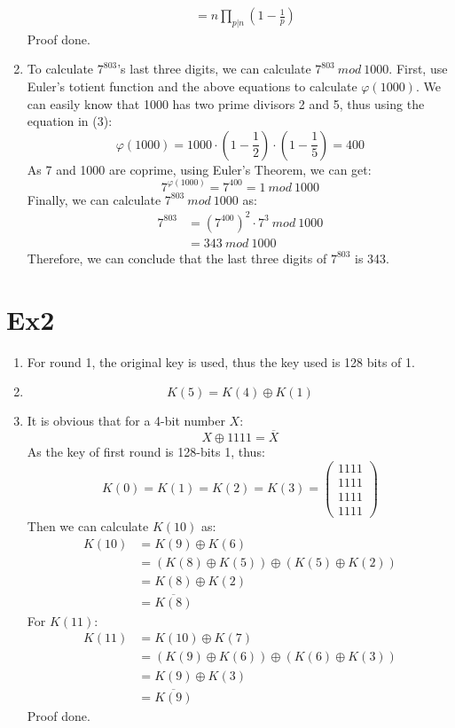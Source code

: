 \documentclass[12pt, a4paper]{article}
\begin{document}
\begin{enumerate}
\begin{align*}
                         &= n \prod_{p|n}(1 - \frac{1}{p})
          \end{align*}
          Proof done.
    \item To calculate $7^{803}$'s last three digits, we can calculate $7^{803}\ mod\ 1000$.\newline
          First, use Euler's totient function and the above equations to calculate $\varphi(1000)$. 
          We can easily know that 1000 has two prime divisors 2 and 5, thus using the equation in (3):
          $$\varphi(1000) = 1000\cdot (1 - \frac{1}{2})\cdot (1 - \frac{1}{5}) = 400$$
          As 7 and 1000 are coprime, using Euler's Theorem, we can get:
          $$7^{\varphi(1000)} = 7^{400} = 1\ mod\ 1000$$
          Finally, we can calculate $7^{803}\ mod\ 1000$ as:
          \begin{align*}
              7^{803} &= (7^{400})^2\cdot 7^3\ mod\ 1000\\
                      &= 343\ mod\ 1000
          \end{align*}
          Therefore, we can conclude that the last three digits of $7^{803}$ is 343.
          
\end{enumerate}

\section*{Ex2}
\begin{enumerate}
    \item For round 1, the original key is used, thus the key used is 128 bits of 1.
    \item $$K(5) = K(4) \oplus K(1)$$
    \item It is obvious that for a 4-bit number $X$:
          $$X \oplus 1111 = \overline{X}$$
          As the key of first round is 128-bits 1, thus:
          $$K(0) = K(1) = K(2) = K(3) = \begin{pmatrix} 1111\\ 1111\\ 1111\\ 1111\end{pmatrix}$$
          Then we can calculate $K(10)$ as:
          \begin{align*}
              K(10) &= K(9) \oplus K(6)\\
                    &= (K(8) \oplus K(5)) \oplus (K(5) \oplus K(2))\\
                    &= K(8) \oplus K(2)\\
                    &= \overline{K(8)}
          \end{align*}
          For $K(11)$:
          \begin{align*}
            K(11) &= K(10) \oplus K(7)\\
                  &= (K(9) \oplus K(6)) \oplus (K(6) \oplus K(3))\\
                  &= K(9) \oplus K(3)\\
                  &= \overline{K(9)}
        \end{align*}
        Proof done.
\end{enumerate}
\end{document}
